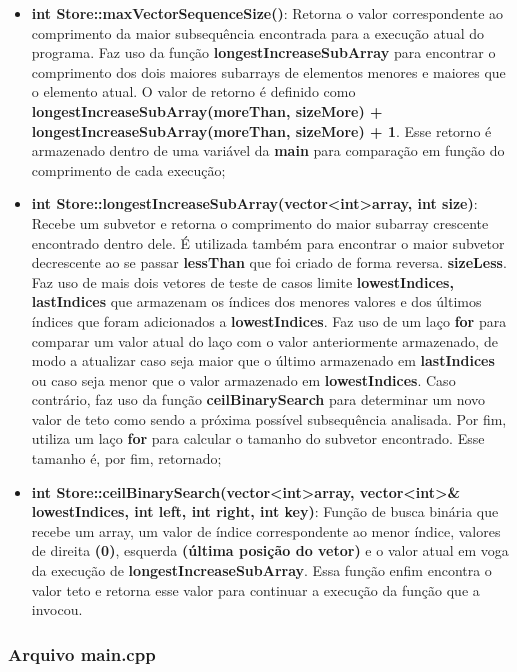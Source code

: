 \documentclass[12pt]{article}
\begin{document}
\begin{itemize}
    \item \textbf{int Store::maxVectorSequenceSize()}: Retorna o valor correspondente ao comprimento da maior subsequência encontrada para a execução atual do programa. Faz uso da função \textbf{longestIncreaseSubArray} para encontrar o comprimento dos dois maiores subarrays de elementos menores e maiores que o elemento atual. O valor de retorno é definido como \textbf{longestIncreaseSubArray(moreThan, sizeMore) + longestIncreaseSubArray(moreThan, sizeMore) + 1}. Esse retorno é armazenado dentro de uma variável da \textbf{main} para comparação em função do comprimento de cada execução;
    \item \textbf{int Store::longestIncreaseSubArray(vector\textless int\textgreater array, int size)}: Recebe um subvetor e retorna o comprimento do maior subarray crescente encontrado dentro dele. É utilizada também para encontrar o maior subvetor decrescente ao se passar \textbf{lessThan} que foi criado de forma reversa. \textbf{sizeLess}. Faz uso de mais dois vetores de teste de casos limite \textbf{lowestIndices, lastIndices} que armazenam os índices dos menores valores e dos últimos índices que foram adicionados a \textbf{lowestIndices}. Faz uso de um laço \textbf{for} para comparar um valor atual do laço com o valor anteriormente armazenado, de modo a atualizar caso seja maior que o último armazenado em \textbf{lastIndices} ou caso seja menor que o valor armazenado em \textbf{lowestIndices}. Caso contrário, faz uso da função \textbf{ceilBinarySearch} para determinar um novo valor de teto como sendo a próxima possível subsequência analisada. Por fim, utiliza um laço \textbf{for} para calcular o tamanho do subvetor encontrado. Esse tamanho é, por fim, retornado;
    \item \textbf{int Store::ceilBinarySearch(vector\textless int\textgreater array, vector\textless int\textgreater\& lowestIndices, int left, int right, int key)}: Função de busca binária que recebe um array, um valor de índice correspondente ao menor índice, valores de direita \textbf{(0)}, esquerda \textbf{(última posição do vetor)} e o valor atual em voga da execução de \textbf{longestIncreaseSubArray}. Essa função enfim encontra o valor teto e retorna esse valor para continuar a execução da função que a invocou.
    \end{itemize}
    
    \subsubsection{Arquivo main.cpp}
    
\end{document}
